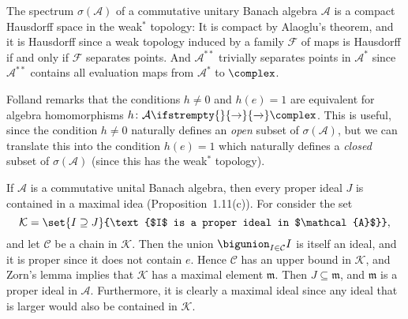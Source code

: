 \documentclass[article, a4paper, 11pt, oneside]{memoir}
\numberwithin{equation}{chapter}
\newcommand{\calF}{\mathcal{F}}
\newcommand{\calA}{\mathcal{A}}
\newcommand{\calC}{\mathcal{C}}
\renewcommand\to[1][]{%
    \ifstrempty{#1}{%
        \rightarrow
    }{%
        \xrightarrow[#1]{}
    }%
}
\begin{document}
\begin{remark}
    The spectrum $\sigma(\calA)$ of a commutative unitary Banach algebra $\calA$ is a compact Hausdorff space in the weak$^*$ topology: It is compact by Alaoglu's theorem, and it is Hausdorff since a weak topology induced by a family $\calF$ of maps is Hausdorff if and only if $\calF$ separates points. And $\calA^{**}$ trivially separates points in $\calA^*$ since $\calA^{**}$ contains all evaluation maps from $\calA^*$ to $\complex$.

    Folland remarks that the conditions $h \neq 0$ and $h(e) = 1$ are equivalent for algebra homomorphisms $h \colon \calA \to \complex$. This is useful, since the condition $h \neq 0$ naturally defines an \emph{open} subset of $\sigma(\calA)$, but we can translate this into the condition $h(e) = 1$ which naturally defines a \emph{closed} subset of $\sigma(\calA)$ (since this has the weak$^*$ topology).
\end{remark}

\newcommand{\calK}{\mathcal{K}}
\newcommand{\frakm}{\mathfrak{m}}

\begin{remark}
    If $\calA$ is a commutative unital Banach algebra, then every proper ideal $J$ is contained in a maximal idea (Proposition~1.11(c)). For consider the set
    \begin{equation*}
        \calK
            = \set{I \supseteq J}{\text{$I$ is a proper ideal in $\calA$}},
    \end{equation*}
    and let $\calC$ be a chain in $\calK$. Then the union $\bigunion_{I \in \calC} I$ is itself an ideal, and it is proper since it does not contain $e$. Hence $\calC$ has an upper bound in $\calK$, and Zorn's lemma implies that $\calK$ has a maximal element $\frakm$. Then $J \subseteq \frakm$, and $\frakm$ is a proper ideal in $\calA$. Furthermore, it is clearly a maximal ideal since any ideal that is larger would also be contained in $\calK$.
\end{remark}
\end{document}
